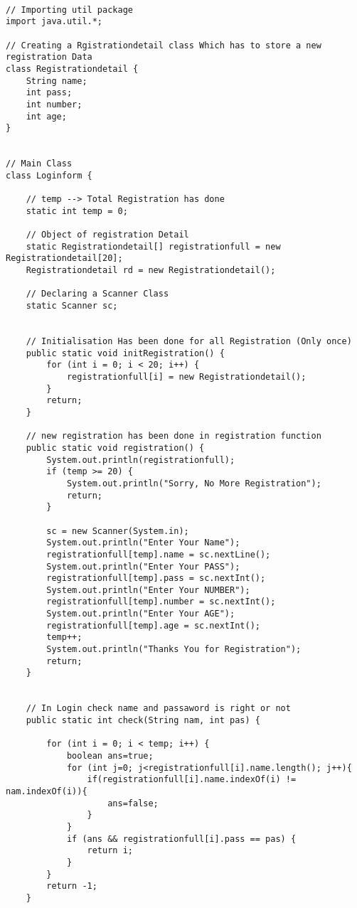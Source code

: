 \documentclass[12pt]{article}
\begin{document}
\begin{lstlisting}[]

// Importing util package
import java.util.*;

// Creating a Rgistrationdetail class Which has to store a new registration Data
class Registrationdetail {
    String name;
    int pass;
    int number;
    int age;
}


// Main Class
class Loginform {

    // temp --> Total Registration has done
    static int temp = 0;

    // Object of registration Detail
    static Registrationdetail[] registrationfull = new Registrationdetail[20];
    Registrationdetail rd = new Registrationdetail();

    // Declaring a Scanner Class
    static Scanner sc;


    // Initialisation Has been done for all Registration (Only once)
    public static void initRegistration() {
        for (int i = 0; i < 20; i++) {
            registrationfull[i] = new Registrationdetail();
        }
        return;
    }

    // new registration has been done in registration function
    public static void registration() {
        System.out.println(registrationfull);
        if (temp >= 20) {
            System.out.println("Sorry, No More Registration");
            return;
        }

        sc = new Scanner(System.in);
        System.out.println("Enter Your Name");
        registrationfull[temp].name = sc.nextLine();
        System.out.println("Enter Your PASS");
        registrationfull[temp].pass = sc.nextInt();
        System.out.println("Enter Your NUMBER");
        registrationfull[temp].number = sc.nextInt();
        System.out.println("Enter Your AGE");
        registrationfull[temp].age = sc.nextInt();
        temp++;
        System.out.println("Thanks You for Registration");
        return;
    }


    // In Login check name and passaword is right or not
    public static int check(String nam, int pas) {

        for (int i = 0; i < temp; i++) {
            boolean ans=true;
            for (int j=0; j<registrationfull[i].name.length(); j++){
                if(registrationfull[i].name.indexOf(i) != nam.indexOf(i)){
                    ans=false;
                }
            }
            if (ans && registrationfull[i].pass == pas) {
                return i;
            }
        }
        return -1;
    }


\end{lstlisting}
\end{document}
